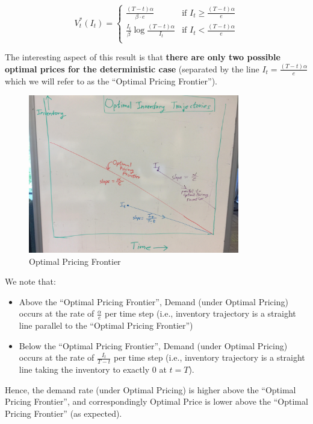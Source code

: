 \documentclass[12pt]{amsart}
\begin{document}
$$
V_t^*(I_t) = 
\begin{cases}
\frac {(T-t) \alpha} {\beta \cdot e} & \text{if } I_t \geq \frac {(T-t) \alpha} e \\
\frac {I_t} {\beta} \log{ \frac {(T-t) \alpha} {I_t}} & \text{if } I_t < \frac {(T-t) \alpha} e\\
\end{cases}
$$

The interesting aspect of this result is that {\bf there are only two possible optimal prices for the deterministic case} (separated by the line $I_t = \frac {(T-t) \alpha} e$ which we will refer to as the ``Optimal Pricing Frontier'').

\begin{figure}[H]
  \includegraphics[width=0.82\textwidth]{frontier.jpg}
  \caption{Optimal Pricing Frontier}
\end{figure}

We note that:
\begin{itemize}
\item Above the ``Optimal Pricing Frontier'', Demand (under Optimal Pricing) occurs at the rate of $\frac \alpha e$ per time step (i.e., inventory trajectory is a straight line parallel to the ``Optimal Pricing Frontier'')
\item Below the ``Optimal Pricing Frontier'', Demand (under Optimal Pricing) occurs at the rate of $\frac {I_t} {T-t}$ per time step (i.e., inventory trajectory is a straight line taking the inventory to exactly 0 at $t=T$).
\end{itemize}

Hence, the demand rate (under Optimal Pricing) is higher above the ``Optimal Pricing Frontier'', and correspondingly Optimal Price is lower above the ``Optimal Pricing Frontier'' (as expected). 
\end{document}
